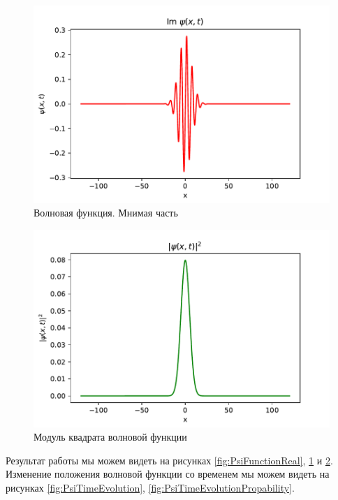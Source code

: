 \documentclass[a4paper, 12pt]{article}
\begin{document}
    \begin{figure}[h!]
        \centering
        \includegraphics{images/PsiFunctionImag.pdf}
        \caption{Волновая функция. Мнимая часть}
        \label{fig:PsiFunctionImag}
    \end{figure}

    \begin{figure}[h!]
        \centering
        \includegraphics{images/PsiFunctionPropability.pdf}
        \caption{Модуль квадрата волновой функции}
        \label{fig:PsiFunctionPropability}
    \end{figure}

    Результат работы мы можем видеть на рисунках \ref{fig:PsiFunctionReal}, \ref{fig:PsiFunctionImag} и 
    \ref{fig:PsiFunctionPropability}. Изменение положения волновой функции со временем мы можем видеть на рисунках 
    \ref{fig:PsiTimeEvolution}, \ref{fig:PsiTimeEvolutionPropability}.
\end{document}
